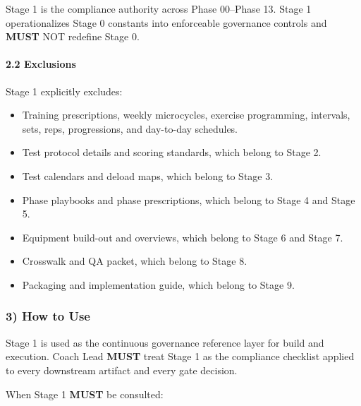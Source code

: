 \documentclass[10pt]{article}
\begin{document}
Stage 1 is the compliance authority across Phase 00–Phase 13. Stage 1 operationalizes Stage 0 constants into enforceable governance controls and \textbf{MUST} NOT redefine Stage 0.

\paragraph*{2.2 Exclusions}

Stage 1 explicitly excludes:

\begin{itemize}
\item Training prescriptions, weekly microcycles, exercise programming, intervals, sets, reps, progressions, and day-to-day schedules.
\item Test protocol details and scoring standards, which belong to Stage 2.
\item Test calendars and deload maps, which belong to Stage 3.
\item Phase playbooks and phase prescriptions, which belong to Stage 4 and Stage 5.
\item Equipment build-out and overviews, which belong to Stage 6 and Stage 7.
\item Crosswalk and QA packet, which belong to Stage 8.
\item Packaging and implementation guide, which belong to Stage 9.
\end{itemize}

\subsubsection*{3) How to Use}

Stage 1 is used as the continuous governance reference layer for build and execution. Coach Lead \textbf{MUST} treat Stage 1 as the compliance checklist applied to every downstream artifact and every gate decision.

When Stage 1 \textbf{MUST} be consulted:
\end{document}
